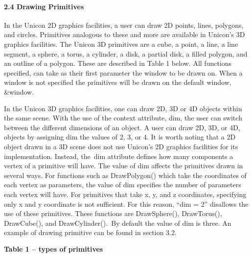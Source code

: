 \documentclass[letterpaper]{article}
\begin{document}
\bigskip

\paragraph[2.4 Drawing Primitives]{\bfseries 2.4 Drawing Primitives}

\bigskip

{
In the Unicon 2D graphics facilities, a user can draw 2D points, lines, polygons, and circles. Primitives analogous to
these and more are available in Unicon's 3D graphics facilities. The Unicon 3D primitives are a cube, a point, a line,
a line segment, a sphere, a torus, a cylinder, a disk, a partial disk, a filled polygon, and an outline of a polygon.
These are described in Table 1 below. All functions specified, can take as their first parameter the window to be drawn
on. When a window is not specified the primitives will be drawn on the default window, \textsf{\&window}.}

{
In the Unicon 3D graphics facilities, one can draw 2D, 3D or 4D objects within the same scene. With the use of the
context attribute, \textsf{dim}, the user can switch between the different dimensions of an object. A user can draw 2D,
3D, or 4D, objects by assigning \textsf{dim} the values of 2, 3, or 4. It is worth noting that a 2D object drawn in a
3D scene does not use Unicon's 2D graphics facilities for its implementation. Instead, the\texttt{ }\textsf{dim}
attribute defines how many components a vertex of a primitive will have. The value of \textsf{dim} affects the
primitives drawn in several ways. For functions such as \textsf{DrawPolygon()} which take the coordinates of each
vertex as parameters, the value of \textsf{dim} specifies the number of parameters each vertex will have. For
primitives that take x, y, and z coordinates, specifying only x and y coordinate is not sufficient. For this reason,
\textsf{{}``dim = 2''} disallows the use of these primitives. These functions are \textsf{DrawSphere(), DrawTorus(),
DrawCube(), and DrawCylinder()}.\texttt{ }By default the value of \textsf{dim} is three. An example of drawing
primitive can be found in section 3.2.}


\bigskip

\clearpage
\bigskip

{\centering{}\bfseries
Table 1 -- types of primitives
\par}


\bigskip
\end{document}

